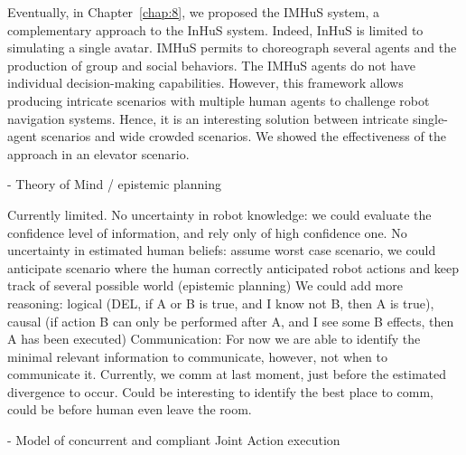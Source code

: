 Eventually, in Chapter~\ref{chap:8}, we proposed the IMHuS system, a complementary approach to the InHuS system. Indeed, InHuS is limited to simulating a single avatar. IMHuS permits to choreograph several agents and the production of group and social behaviors. The IMHuS agents do not have individual decision-making capabilities. However, this framework allows producing intricate scenarios with multiple human agents to challenge robot navigation systems. Hence, it is an interesting solution between intricate single-agent scenarios and wide crowded scenarios. We showed the effectiveness of the approach in an elevator scenario. 



- Theory of Mind / epistemic planning

Currently limited. 
No uncertainty in robot knowledge: we could evaluate the confidence level of information, and rely only of high confidence one.
No uncertainty in estimated human beliefs: assume worst case scenario, we could anticipate scenario where the human correctly anticipated robot actions and keep track of several possible world (epistemic planning)
We could add more reasoning: logical (DEL, if A or B is true, and I know not B, then A is true), causal (if action B can only be performed after A, and I see some B effects, then A has been executed)
Communication: For now we are able to identify the minimal relevant information to communicate, however, not when to communicate it. Currently, we comm at last moment, just before the estimated divergence to occur. Could be interesting to identify the best place to comm, could be before human even leave the room.

- Model of concurrent and compliant Joint Action execution

